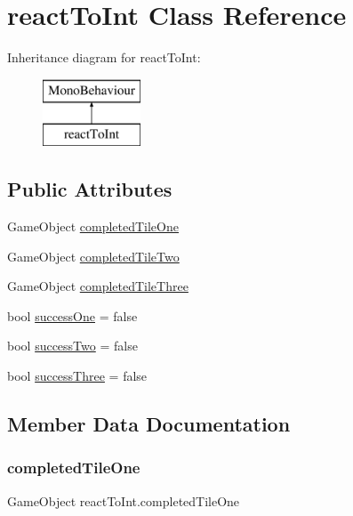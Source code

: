 \hypertarget{classreact_to_int}{}\section{react\+To\+Int Class Reference}
\label{classreact_to_int}
Inheritance diagram for react\+To\+Int\+:\begin{figure}[H]
\begin{center}
\leavevmode
\includegraphics[height=2.000000cm]{classreact_to_int}
\end{center}
\end{figure}
\subsection*{Public Attributes}
\begin{DoxyCompactItemize}
\item 
Game\+Object \hyperlink{classreact_to_int_ae993b1723bbfb55024c01eabbf970987}{completed\+Tile\+One}
\item 
Game\+Object \hyperlink{classreact_to_int_a378f4e301a52611a7ad37e26d84163e2}{completed\+Tile\+Two}
\item 
Game\+Object \hyperlink{classreact_to_int_a7d73d99176356de1e1840dc34c9a0b83}{completed\+Tile\+Three}
\item 
bool \hyperlink{classreact_to_int_a58c7e32c155e08531808c06fe5bfcd32}{success\+One} = false
\item 
bool \hyperlink{classreact_to_int_a3f6577c488500ab6f853be944a31eec3}{success\+Two} = false
\item 
bool \hyperlink{classreact_to_int_ac39541aef39e7268271737e7cbd3df22}{success\+Three} = false
\end{DoxyCompactItemize}


\subsection{Member Data Documentation}
\mbox{\label{classreact_to_int_ae993b1723bbfb55024c01eabbf970987}} 
\subsubsection{\texorpdfstring{completed\+Tile\+One}{completedTileOne}}
{\footnotesize\ttfamily Game\+Object react\+To\+Int.\+completed\+Tile\+One}

